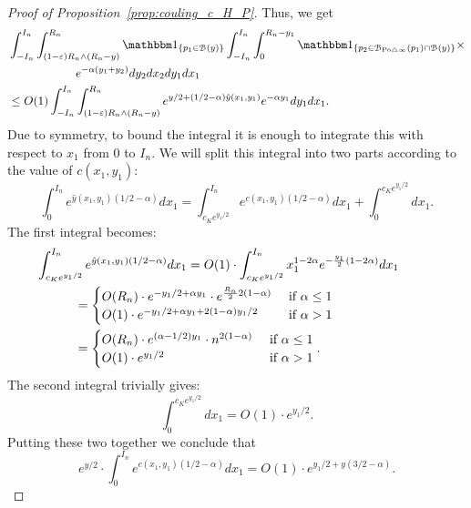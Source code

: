\begin{proof}[Proof of Proposition~\ref{prop:couling_c_H_P}]
Thus, we get
\begin{align*}
	&\int_{-I_n}^{I_n} \int_{(1-\eps) R_n \wedge (R_n-y)}^{R_n} \ind{p_1 \in \BallHyp{y}}
		\int_{-I_n}^{I_n} \int_{0}^{R_n-y_1} 
		\ind{p_2 \in \BallSym{p_1} \cap \BallHyp{y}} \times \\ 
	& \hspace{2cm}  e^{-\alpha(y_1 + y_2)} dy_2 dx_2 dy_1 dx_1 \\
	&\leq O(1) \int_{-I_n}^{I_n} \int_{(1-\eps) R_n \wedge (R_n-y)}^{R_n} 
		e^{y/2 + (1/2 -\alpha) \hat{y}(x_1,y_1)} e^{-\alpha y_1} dy_1 dx_1. 
\end{align*}
Due to symmetry, to bound the integral it is enough to integrate this with respect to $x_1$ from 0 to $I_n$.
We will split this integral into two parts according to the value of $c(x_1,y_1)$:
\[
	\int_0^{I_n} e^{\hat{y}(x_1,y_1) (1/2 -\alpha)} dx_1 = 
	\int_{c_K e^{y_1/2}}^{I_n} e^{c(x_1,y_1) (1/2 -\alpha)} dx_1 + \int_0^{c_K e^{y_1/2}} dx_1.
\]
The first integral becomes: 
\begin{align*}
	&\hspace{-30pt}\int_{c_K e^{y_1/2}}^{I_n} e^{\hat{y}(x_1,y_1) (1/2 -\alpha)} dx_1  = 
 		O(1)\cdot \int_{c_K e^{y_1/2}}^{I_n} x_1^{1 -2\alpha} 
		e^{-\frac{y_1}{2} (1-2\alpha)} dx_1 \\
	&= \begin{cases}
		O(R_n) \cdot e^{-y_1/2 + \alpha y_1} \cdot e^{\frac{R_n}{2} 2(1-\alpha)} & \ \mbox{if $\alpha \leq 1$}\\
		O(1) \cdot e^{-y_1/2 + \alpha y_1 + 2(1-\alpha)y_1/2} & \ \mbox{if $\alpha > 1$}
		\end{cases}\\
	&=\begin{cases}
		O(R_n) \cdot e^{(\alpha -1/2) y_1} \cdot n^{2(1-\alpha)} & \ \mbox{if $\alpha \leq 1$}\\
		O(1) \cdot e^{y_1/2} &\ \mbox{if $\alpha > 1$}
	\end{cases}.  
\end{align*}
The second integral trivially gives: 
\[
	\int_0^{c_K e^{y_1/2}} dx_1 = O(1) \cdot e^{y_1/2}.
\]
Putting these two together we conclude that 
\[
	e^{y/2} \cdot \int_0^{I_n} e^{c(x_1,y_1) (1/2 -\alpha)} dx_1
	= O(1) \cdot e^{y_1/2 +y(3/2-\alpha)}.
\]


\end{proof}
